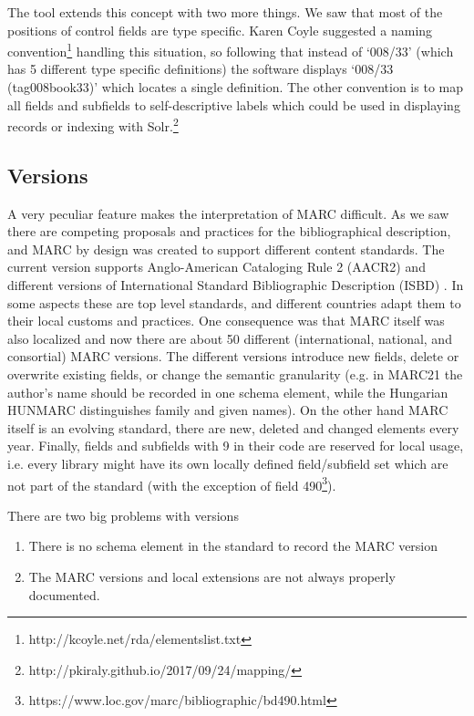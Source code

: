 The tool extends this concept with two more things. We saw that most of the positions of control fields are type specific. Karen Coyle suggested a naming convention\footnote{http://kcoyle.net/rda/elementslist.txt} handling this situation, so following that instead of `008/33' (which has 5 different type specific definitions) the software displays `008/33 (tag008book33)' which locates a single definition. The other convention is to map all fields and subfields to self-descriptive labels which could be used in displaying records or indexing with Solr.\footnote{http://pkiraly.github.io/2017/09/24/mapping/}

\subsection{Versions}

A very peculiar feature makes the interpretation of MARC difficult. As we saw there are competing proposals and practices for the bibliographical description, and MARC by design was created to support different content standards. The current version supports Anglo-American Cataloging Rule 2 (AACR2) \cite{aacr2} and different versions of International Standard Bibliographic Description (ISBD) \cite{isbd}. In some aspects these are top level standards, and different countries adapt them to their local customs and practices. One consequence was that MARC itself was also localized and now there are about 50 different (international, national, and consortial) MARC versions. The different versions introduce new fields, delete or overwrite existing fields, or change the semantic granularity (e.g. in MARC21 the author's name should be recorded in one schema element, while the Hungarian HUNMARC distinguishes family and given names). On the other hand MARC itself is an evolving standard, there are new, deleted and changed elements every year. Finally, fields and subfields with 9 in their code are reserved for local usage, i.e. every library might have its own locally defined field/subfield set which are not part of the standard (with the exception of field 490\footnote{https://www.loc.gov/marc/bibliographic/bd490.html}).

There are two big problems with versions

\begin{enumerate}
  \item There is no schema element in the standard to record the MARC version
  \item The MARC versions and local extensions are not always properly documented.
\end{enumerate}

